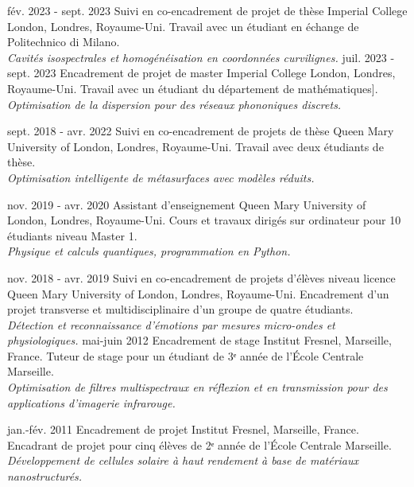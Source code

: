 \documentclass{cv}
\begin{document}
\begin{entrylist}

	\entry
	{fév. 2023 - sept. 2023}
	{Suivi en co-encadrement de projet de thèse}
	{Imperial College London, Londres, Royaume-Uni.}
	{Travail avec un étudiant en échange de Politechnico di Milano.\\
		\emph{Cavités isospectrales et homogénéisation en coordonnées curvilignes.}}
	\entry
	{juil. 2023 - sept. 2023}
	{Encadrement de projet de master}
	{Imperial College London, Londres, Royaume-Uni.}
	{Travail avec un étudiant du département de mathématiques].\\
		\emph{Optimisation de la dispersion pour des réseaux phononiques discrets.}}

	\entry
	{sept. 2018 - avr. 2022}
	{Suivi en co-encadrement de projets de thèse}
	{Queen Mary University of London, Londres, Royaume-Uni.}
	{Travail avec deux étudiants de thèse.\\
		\emph{Optimisation intelligente de métasurfaces avec modèles réduits.}}

	\entry
	{nov. 2019 - avr. 2020}
	{Assistant d'enseignement}
	{Queen Mary University of London, Londres, Royaume-Uni.}
	{Cours et travaux dirigés sur ordinateur pour 10 étudiants niveau Master 1.\\
		\emph{Physique et calculs quantiques, programmation en Python.}}


	\entry
	{nov. 2018 - avr. 2019}
	{Suivi en co-encadrement de projets d'élèves niveau licence}
	{Queen Mary University of London, Londres, Royaume-Uni.}
	{Encadrement d'un projet transverse et multidisciplinaire d'un groupe de quatre étudiants.\\
		\emph{Détection et reconnaissance d'émotions par mesures micro-ondes et physiologiques.}}
	\entry
	{mai-juin 2012}
	{Encadrement de stage}
	{Institut Fresnel, Marseille, France.}
	{Tuteur de stage pour un étudiant de 3ᵉ année de l'École Centrale Marseille.\\
		\emph{Optimisation de filtres multispectraux en réflexion et en transmission
			pour des applications d'imagerie infrarouge.}}



	\entry
	{jan.-fév. 2011}
	{Encadrement de projet}
	{Institut Fresnel, Marseille, France.}
	{Encadrant de projet pour cinq élèves de 2ᵉ année de l'École Centrale Marseille.\\
		\emph{Développement de cellules solaire à haut rendement à base de
			matériaux nanostructurés.}}

\end{entrylist}
\end{document}
